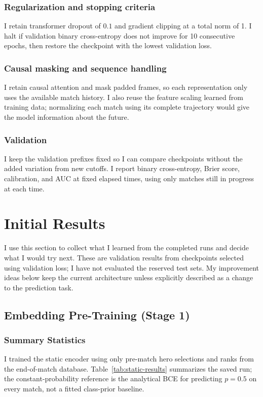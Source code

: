 \documentclass[11pt]{article}
\begin{document}
    \subsubsection{Regularization and stopping criteria}
        I retain transformer dropout of $0.1$ and gradient clipping at a total norm of 1. I halt if validation binary cross-entropy does not improve for 10 consecutive epochs, then restore the checkpoint with the lowest validation loss.

    \subsubsection{Causal masking and sequence handling}
        I retain causal attention and mask padded frames, so each representation only uses the available match history. I also reuse the feature scaling learned from training data; normalizing each match using its complete trajectory would give the model information about the future.

    \subsubsection{Validation}
        I keep the validation prefixes fixed so I can compare checkpoints without the added variation from new cutoffs. I report binary cross-entropy, Brier score, calibration, and AUC at fixed elapsed times, using only matches still in progress at each time.



\clearpage
\section{Initial Results}
    I use this section to collect what I learned from the completed runs and
    decide what I would try next. These are validation results from checkpoints
    selected using validation loss; I have not evaluated the reserved test sets.
    My improvement ideas below keep the current architecture unless explicitly
    described as a change to the prediction task.

\subsection{Embedding Pre-Training (Stage 1)}
\subsubsection{Summary Statistics}
    I trained the static encoder using only pre-match hero selections and ranks
    from the end-of-match database. Table~\ref{tab:static-results} summarizes the
    saved run; the constant-probability reference is the analytical BCE for
    predicting $p=0.5$ on every match, not a fitted class-prior baseline.
\end{document}
